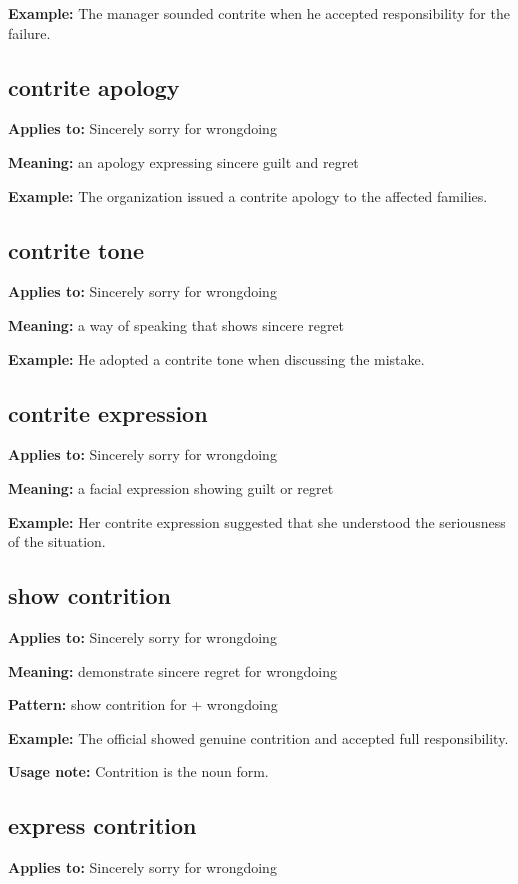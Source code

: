 \documentclass[11pt]{article}
\begin{document}
\textbf{Example:} The manager sounded contrite when he accepted responsibility for the failure.

\subsection{contrite apology}
\textbf{Applies to:} Sincerely sorry for wrongdoing

\textbf{Meaning:} an apology expressing sincere guilt and regret

\textbf{Example:} The organization issued a contrite apology to the affected families.

\subsection{contrite tone}
\textbf{Applies to:} Sincerely sorry for wrongdoing

\textbf{Meaning:} a way of speaking that shows sincere regret

\textbf{Example:} He adopted a contrite tone when discussing the mistake.

\subsection{contrite expression}
\textbf{Applies to:} Sincerely sorry for wrongdoing

\textbf{Meaning:} a facial expression showing guilt or regret

\textbf{Example:} Her contrite expression suggested that she understood the seriousness of the situation.

\subsection{show contrition}
\textbf{Applies to:} Sincerely sorry for wrongdoing

\textbf{Meaning:} demonstrate sincere regret for wrongdoing

\textbf{Pattern:} show contrition for + wrongdoing

\textbf{Example:} The official showed genuine contrition and accepted full responsibility.

\textbf{Usage note:} Contrition is the noun form.

\subsection{express contrition}
\textbf{Applies to:} Sincerely sorry for wrongdoing
\end{document}
